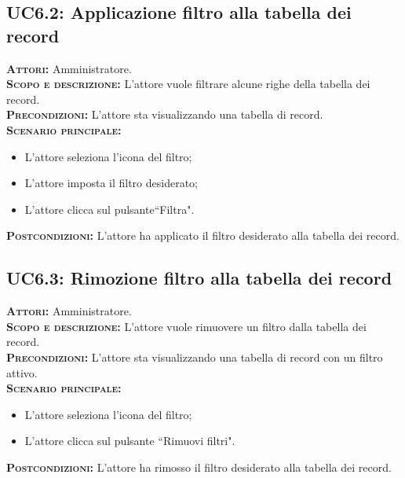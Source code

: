 \subsection{UC6.2: Applicazione filtro alla tabella dei record}
\label{sec:UC62}
\textsc{\textbf{Attori:}} Amministratore.\\
\textsc{\textbf{Scopo e descrizione:}} L'attore vuole filtrare alcune righe della tabella dei record.\\
\textsc{\textsc{\textbf{Precondizioni:}}} L'attore sta visualizzando una tabella di record.\\
\textsc{\textbf{Scenario principale:}} 
\begin{itemize}
    \item L'attore seleziona l'icona del filtro;
    \item L'attore imposta il filtro desiderato;
    \item L'attore clicca sul pulsante``Filtra".
\end{itemize}
\textsc{\textbf{Postcondizioni:}} L'attore ha applicato il filtro desiderato alla tabella dei record.

\subsection{UC6.3: Rimozione filtro alla tabella dei record}
\label{sec:UC63}
\textsc{\textbf{Attori:}} Amministratore.\\
\textsc{\textbf{Scopo e descrizione:}} L'attore vuole rimuovere un filtro dalla tabella dei record.\\
\textsc{\textsc{\textbf{Precondizioni:}}} L'attore sta visualizzando una tabella di record con un filtro attivo.\\
\textsc{\textbf{Scenario principale:}} 
\begin{itemize}
    \item L'attore seleziona l'icona del filtro;
    \item L'attore clicca sul pulsante ``Rimuovi filtri".
\end{itemize}
\textsc{\textbf{Postcondizioni:}} L'attore ha rimosso il filtro desiderato alla tabella dei record.

